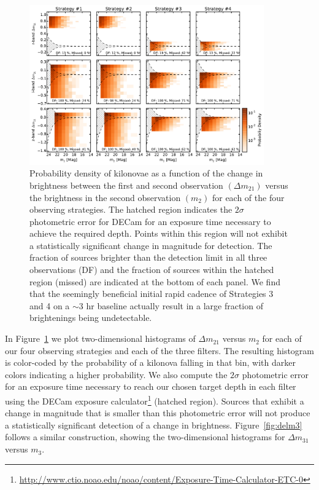 \begin{figure}[t!]
\centering
\includegraphics[width=0.9\textwidth]{./figs/chapter2/ch2_f6.pdf}
\caption{Probability density of kilonovae as a function of the change in brightness between the first and second observation $(\Delta m_21)$ versus the brightness in the second observation $(m_2)$ for each of the four observing strategies. The hatched region indicates the $2\sigma$ photometric error for DECam for an exposure time necessary to achieve the required depth. Points within this region will not exhibit a statistically significant change in magnitude for detection. The fraction of sources brighter than the detection limit in all three observations (DF) and the fraction of sources within the hatched region (missed) are indicated at the bottom of each panel. We find that the seemingly beneficial initial rapid cadence of Strategies 3 and 4 on a $\sim$3 hr baseline actually result in a large fraction of brightenings being undetectable.}
\label{fig:delm2}
\end{figure}
   
In Figure~\ref{fig:delm2} we plot two-dimensional histograms of $\Delta m_{21}$ versus $m_2$ for each of our four observing strategies and each of the three filters. The resulting histogram is color-coded by the probability of a kilonova falling in that bin, with darker colors indicating a higher probability. We also compute the $2\sigma$ photometric error for an exposure time necessary to reach our chosen target depth in each filter using the DECam exposure calculator\footnote{\url{http://www.ctio.noao.edu/noao/content/Exposure-Time-Calculator-ETC-0}} (hatched region). Sources that exhibit a change in magnitude that is smaller than this photometric error will not produce a statistically significant detection of a change in brightness. Figure~\ref{fig:delm3} follows a similar construction, showing the two-dimensional histograms for $\Delta m_{31}$ versus $m_3$.

